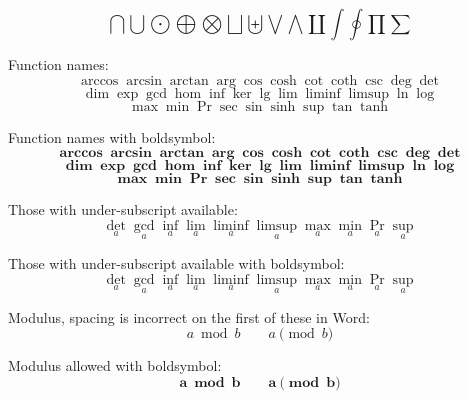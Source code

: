 \documentclass[12pt,a4paper]{article}
\theoremstyle{clearprint}
\begin{document}
\begin{equation}
\bigcap \bigcup \bigodot \bigoplus \bigotimes \bigsqcup \biguplus \bigvee \bigwedge \coprod \int \oint \prod \sum
\end{equation}

\noindent 
Function names: %
\begin{equation}
\arccos \arcsin \arctan \arg \cos \cosh \cot \coth \csc \deg \det 
\end{equation}
\begin{equation}
\dim \exp \gcd \hom \inf \ker \lg \lim \liminf \limsup \ln \log 
\end{equation}
\begin{equation}
\max \min \Pr \sec \sin \sinh \sup \tan \tanh
\end{equation}

\noindent 
Function names with boldsymbol:
\begin{equation}
\boldsymbol{\arccos \arcsin \arctan \arg \cos \cosh \cot \coth \csc \deg \det} 
\end{equation}
\begin{equation}
\boldsymbol{\dim \exp \gcd \hom \inf \ker \lg \lim \liminf \limsup \ln \log} 
\end{equation}
\begin{equation}
\boldsymbol{\max \min \Pr \sec \sin \sinh \sup \tan \tanh}
\end{equation}

\noindent 
Those with under-subscript available:
\begin{equation}
\det_{a} \gcd_{a} \inf_{a} \lim_{a} \liminf_{a} \limsup_{a} \max_{a} \min_{a} \Pr_{a} \sup_{a}
\end{equation}

\noindent 
Those with under-subscript available with boldsymbol:
\begin{equation}
\det_{a} \gcd_{a} \inf_{a} \lim_{a} \liminf_{a} \limsup_{a} \max_{a} \min_{a} \Pr_{a} \sup_{a}
\end{equation}

\noindent 
Modulus, spacing is incorrect on the first of these in Word:
\begin{equation}
a \bmod b \qquad a \pmod{b}
\end{equation}

\noindent 
Modulus allowed with boldsymbol:
\begin{equation}
\boldsymbol{a \bmod b} \qquad \boldsymbol{a \pmod{b}}
\end{equation}
\end{document}
